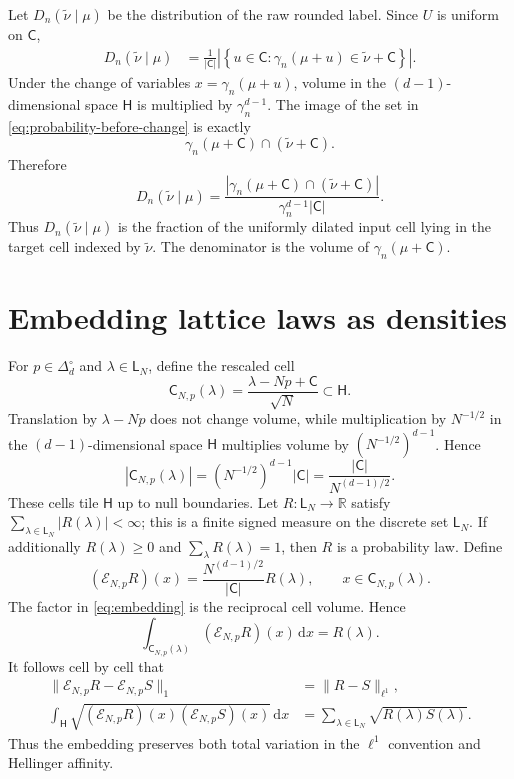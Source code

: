 \documentclass[11pt]{article}
\newcommand{\R}{\mathbb R}
\newcommand{\dd}{\,\mathrm d}
\newcommand{\htile}{\mathsf H}
\begin{document}
Let $D_n(\widetilde\nu\mid\mu)$ be the distribution of the raw rounded
label.  Since $U$ is uniform on $\mathsf C$,
\begin{align}
  D_n(\widetilde\nu\mid\mu)
  &=\frac1{|\mathsf C|}
    \left|\left\{u\in\mathsf C:
    \gamma_n(\mu+u)\in\widetilde\nu+\mathsf C\right\}\right|.
  \label{eq:probability-before-change}
\end{align}
Under the change of variables $x=\gamma_n(\mu+u)$, volume in the
$(d-1)$-dimensional space $\htile$ is multiplied by
$\gamma_n^{d-1}$.  The image of the set in
\eqref{eq:probability-before-change} is exactly
\[
  \gamma_n(\mu+\mathsf C)\cap(\widetilde\nu+\mathsf C).
\]
Therefore
\begin{equation}\label{eq:cell-kernel-note}
  D_n(\widetilde\nu\mid\mu)
  =\frac{
    |\gamma_n(\mu+\mathsf C)\cap(\widetilde\nu+\mathsf C)|}
    {\gamma_n^{d-1}|\mathsf C|}.
\end{equation}
Thus $D_n(\widetilde\nu\mid\mu)$ is the fraction of the uniformly
dilated input cell lying in the target cell indexed by $\widetilde\nu$.
The denominator is the volume of $\gamma_n(\mu+\mathsf C)$.

\section{Embedding lattice laws as densities}

For $p\in\Delta_d^\circ$ and $\lambda\in\mathsf L_N$, define the rescaled
cell
\[
  \mathsf C_{N,p}(\lambda)
  =\frac{\lambda-Np+\mathsf C}{\sqrt N}\subset\htile.
\]
Translation by $\lambda-Np$ does not change volume, while multiplication by
$N^{-1/2}$ in the $(d-1)$-dimensional space $\htile$ multiplies volume by
$(N^{-1/2})^{d-1}$.  Hence
\[
  |\mathsf C_{N,p}(\lambda)|
  =(N^{-1/2})^{d-1}|\mathsf C|
  =\frac{|\mathsf C|}{N^{(d-1)/2}}.
\]
These cells tile $\htile$ up to null boundaries.  Let
$R:\mathsf L_N\to\R$ satisfy
$\sum_{\lambda\in\mathsf L_N}|R(\lambda)|<\infty$; this is a finite signed
measure on the discrete set $\mathsf L_N$.  If additionally $R(\lambda)\geq0$
and $\sum_\lambda R(\lambda)=1$, then $R$ is a probability law.  Define
\begin{equation}\label{eq:embedding}
  (\mathcal E_{N,p}R)(x)
  =\frac{N^{(d-1)/2}}{|\mathsf C|}R(\lambda),
  \qquad x\in\mathsf C_{N,p}(\lambda).
\end{equation}
The factor in \eqref{eq:embedding} is the reciprocal cell volume.  Hence
\[
  \int_{\mathsf C_{N,p}(\lambda)}
  (\mathcal E_{N,p}R)(x)\dd x=R(\lambda).
\]
It follows cell by cell that
\begin{align}
  \|\mathcal E_{N,p}R-\mathcal E_{N,p}S\|_1
  &=\|R-S\|_{\ell^1},
  \label{eq:l1-isometry}\\
  \int_{\htile}\sqrt{(\mathcal E_{N,p}R)(x)
                    (\mathcal E_{N,p}S)(x)}\dd x
  &=\sum_{\lambda\in\mathsf L_N}\sqrt{R(\lambda)S(\lambda)}.
  \label{eq:affinity-isometry}
\end{align}
Thus the embedding preserves both total variation in the $\ell^1$
convention and Hellinger affinity.
\end{document}
